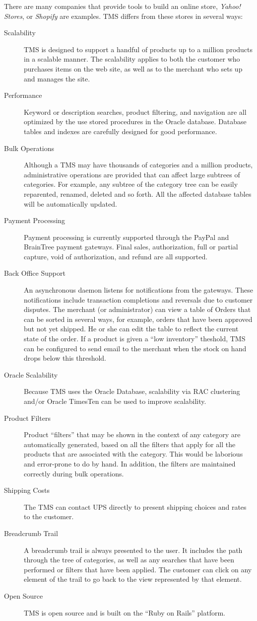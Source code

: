\documentclass[letterpaper, 12pt]{article}
\begin{document}
There are many companies that provide tools to build an online store,  {\em Yahoo! Stores}, or {\em Shopify} are examples.  TMS differs from these stores in several ways:
\begin{description}
 \item[Scalability]  TMS is designed to support a handful of products up to a million products in a scalable manner.  The scalability applies to both the customer who purchases items on the web site, as well as to the merchant who sets up and manages the site. 
\item[Performance] Keyword or description searches, product filtering, and navigation are all optimized by the use stored procedures in the Oracle database.  Database tables and indexes are carefully designed for good performance.
\item[Bulk Operations] Although a TMS may have thousands of categories and a million products, administrative operations are provided that can affect large subtrees of categories.  For example, any subtree of the category tree can be easily reparented, renamed, deleted and so forth.  All the affected database tables will be automatically updated.  
\item[Payment Processing] Payment processing is currently supported through the PayPal and BrainTree payment gateways.  Final sales, authorization, full or partial capture, void of authorization, and refund are all supported.  
\item[Back Office Support] An asynchronous daemon listens for notifications from the gateways.  These notifications include transaction completions and reversals due to customer disputes.  The merchant (or administrator) can view a table of Orders that can be sorted in several ways, for example, orders that have been approved but not yet shipped.  He or she can edit the table to reflect the current state of the order.
If a product is given a ``low inventory'' theshold, TMS can be configured to send email to the merchant when the stock on hand drops below this threshold.
\item[Oracle Scalability] Because  TMS uses the Oracle Database, scalability via RAC clustering and/or Oracle TimesTen can be used to improve scalability. 
\item[Product Filters] Product ``filters'' that may be shown in the context of any category are automatically generated, based on all the filters that apply for all the products that are associated with the category.   This would be laborious and error-prone to do by hand.  In addition, the filters are maintained correctly during bulk operations.
\item[Shipping Costs] The TMS can contact UPS directly to present shipping choices and rates to the customer.
\item[Breadcrumb Trail] A breadcrumb trail is always presented to the user.  It includes the path through the tree of categories, as well as any searches that have been performed or filters that have been applied.  The customer can click on any element of the trail to go back to the view represented by that element.
\item[Open Source] TMS is open source and is built on the ``Ruby on Rails'' platform.
\end{description}
\end{document}
